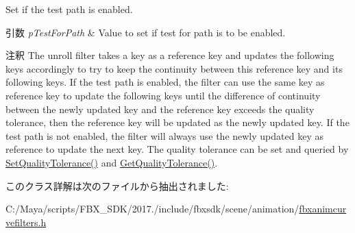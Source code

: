 Set if the test path is enabled. 
\begin{DoxyParams}{引数}
{\em p\+Test\+For\+Path} & Value to set if test for path is to be enabled. \\
\hline
\end{DoxyParams}
\begin{DoxyRemark}{注釈}
The unroll filter takes a key as a reference key and updates the following keys accordingly to try to keep the continuity between this reference key and its following keys. If the test path is enabled, the filter can use the same key as reference key to update the following keys until the difference of continuity between the newly updated key and the reference key exceeds the quality tolerance, then the reference key will be updated as the newly updated key. If the test path is not enabled, the filter will always use the newly updated key as reference to update the next key. The quality tolerance can be set and queried by \hyperlink{class_fbx_anim_curve_filter_unroll_ad8570bf12f5c397fb975fe961aeed29f}{Set\+Quality\+Tolerance()} and \hyperlink{class_fbx_anim_curve_filter_unroll_a881a4c7122073deec59ab208b2bdf95a}{Get\+Quality\+Tolerance()}. 
\end{DoxyRemark}


このクラス詳解は次のファイルから抽出されました\+:\begin{DoxyCompactItemize}
\item 
C\+:/\+Maya/scripts/\+F\+B\+X\+\_\+\+S\+D\+K/2017./include/fbxsdk/scene/animation/\hyperlink{fbxanimcurvefilters_8h}{fbxanimcurvefilters.\+h}\end{DoxyCompactItemize}
